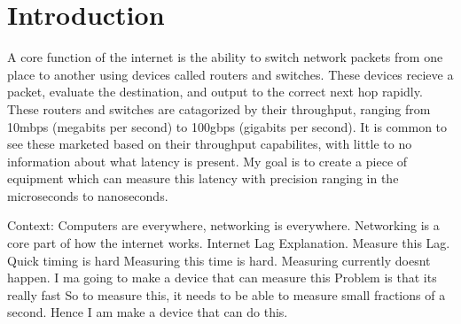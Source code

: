 \chapter{Introduction}\label{C:intro}

\par
A core function of the internet is the ability to switch network packets from one place to another using devices called routers and switches.
These devices recieve a packet, evaluate the destination, and output to the correct next hop rapidly.
These routers and switches are catagorized by their throughput, ranging from 10mbps (megabits per second) to 100gbps (gigabits per second).
It is common to see these marketed based on their throughput capabilites, with little to no information about what latency is present.
My goal is to create a piece of equipment which can measure this latency with precision ranging in the microseconds to nanoseconds.

\par

Context: 
Computers are everywhere, networking is everywhere. Networking is a core part of how the internet works.
Internet Lag Explanation.
Measure this Lag.
Quick timing is hard
Measuring this time is hard.
Measuring currently doesnt happen.
I ma going to make a device that can measure this
Problem is that its really fast
So to measure this, it needs to be able to measure small fractions of a second.
Hence I am make a device that can do this.

